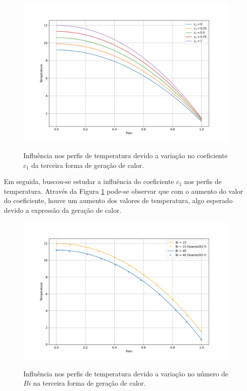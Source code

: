 \begin{figure}[H]
    \centering
    \caption{Influência nos perfis de temperatura devido a variação no coeficiente \(c_1\) da terceira forma de geração de calor.}
    \includegraphics[scale=0.5]{figures/results/Fig10.png}
    \label{fig:influence_of_coefficient_c1}
\end{figure}

Em seguida, buscou-se estudar a influência do coeficiente \(c_1\) nos perfis de temperatura. Através da Figura \ref{fig:influence_of_coefficient_c1} pode-se observar que com o aumento do valor do coeficiente, houve um aumento dos valores de temperatura, algo esperado devido a expressão da geração de calor.

\begin{figure}[H]
    \centering
    \caption{Influência nos perfis de temperatura devido a variação no número de \(Bi\) na terceira forma de geração de calor.}
    \includegraphics[scale=0.5]{figures/results/Fig11.png}
    \label{fig:influence_of_Biot_on_third_heat_generation}
\end{figure}

